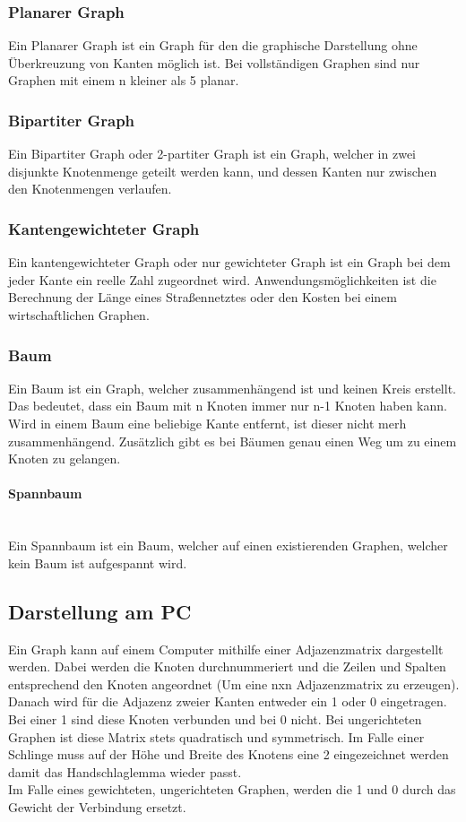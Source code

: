 \documentclass{article}
\newcommand{\paragraphlb}[1]{\paragraph{#1}\mbox{}\\}
\begin{document}
	\subsubsection{Planarer Graph}
	Ein Planarer Graph ist ein Graph für den die graphische Darstellung ohne Überkreuzung von Kanten möglich ist. Bei vollständigen Graphen sind nur Graphen mit einem n kleiner als 5 planar.
	\subsubsection{Bipartiter Graph}
	Ein Bipartiter Graph oder 2-partiter Graph ist ein Graph, welcher in zwei disjunkte Knotenmenge geteilt werden kann, und dessen Kanten nur zwischen den Knotenmengen verlaufen.
	\subsubsection{Kantengewichteter Graph}
	Ein kantengewichteter Graph oder nur gewichteter Graph ist ein Graph bei dem jeder Kante ein reelle Zahl zugeordnet wird. Anwendungsmöglichkeiten ist die Berechnung der Länge eines Straßennetztes oder den Kosten bei einem wirtschaftlichen Graphen.
	\subsubsection{Baum}
	Ein Baum ist ein Graph, welcher zusammenhängend ist und keinen Kreis erstellt. Das bedeutet, dass ein Baum mit n Knoten immer nur n-1 Knoten haben kann. Wird in einem Baum eine beliebige Kante entfernt, ist dieser nicht merh zusammenhängend. Zusätzlich gibt es bei Bäumen genau einen Weg um zu einem Knoten zu gelangen.
	\paragraphlb{Spannbaum}
	Ein Spannbaum ist ein Baum, welcher auf einen existierenden Graphen, welcher kein Baum ist aufgespannt wird.
	\subsection{Darstellung am PC}
	Ein Graph kann auf einem Computer mithilfe einer Adjazenzmatrix dargestellt werden. Dabei werden die Knoten durchnummeriert und die Zeilen und Spalten entsprechend den Knoten angeordnet (Um eine nxn Adjazenzmatrix zu erzeugen). Danach wird für die Adjazenz zweier Kanten entweder ein 1 oder 0 eingetragen. Bei einer 1 sind diese Knoten verbunden und bei 0 nicht. Bei ungerichteten Graphen ist diese Matrix stets quadratisch und symmetrisch. Im Falle einer Schlinge muss auf der Höhe und Breite des Knotens eine 2 eingezeichnet werden damit das Handschlaglemma wieder passt. \\
	Im Falle eines gewichteten, ungerichteten Graphen, werden die 1 und 0 durch das Gewicht der Verbindung ersetzt.
\end{document}

